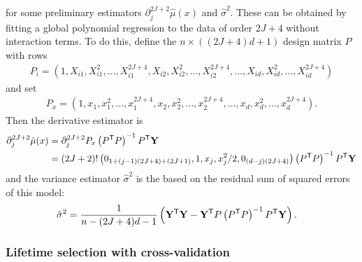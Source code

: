 %
for some preliminary estimators
$\partial^{2 J + 2}_j \hat\mu(x)$ and $\hat\sigma^2$.
These can be obtained by fitting a global polynomial regression
to the data of order $2 J + 4$ without interaction terms.
To do this, define the $n \times ((2 J + 4)d + 1)$ design matrix $P$ with rows
%
\begin{align*}
  P_i = \left(
    1, X_{i1}, X_{i1}^2, \ldots, X_{i1}^{2 J + 4},
    X_{i2}, X_{i2}^2, \ldots, X_{i2}^{2 J + 4},
    \ldots,
    X_{id}, X_{id}^2, \ldots, X_{id}^{2 J + 4}
  \right)
\end{align*}
%
and set
%
\begin{align*}
  P_x = \left(
    1, x_{1}, x_{1}^2, \ldots, x_{1}^{2 J + 4},
    x_{2}, x_{2}^2, \ldots, x_{2}^{2 J + 4},
    \ldots,
    x_{d}, x_{d}^2, \ldots, x_{d}^{2 J + 4}
  \right).
\end{align*}
%
Then the derivative estimator is
%
\begin{align*}
  \partial^{2 J + 2}_j \hat\mu(x)
  &=
  \partial^{2 J + 2}_j P_x
  \left( P^{\mathsf{T}} P \right)^{-1}
  P^{\mathsf{T}} \mathbf{Y} \\
  &=
  (2J + 2)!
  \left(
    0_{1 + (j-1)(2 J + 4) + (2J + 1)},
    1, x_j, x_j^2 / 2,
    0_{(d-j)(2 J + 4)}
  \right)
  \left( P^{\mathsf{T}} P \right)^{-1}
  P^{\mathsf{T}} \mathbf{Y}
\end{align*}
%
and the variance estimator $\hat\sigma^2$ is
the based on the residual sum of squared errors of this model:
%
\begin{align*}
  \hat\sigma^2
  &=
  \frac{1}{n - (2J + 4)d - 1}
  \left(
    \mathbf{Y}^{\mathsf{T}} \mathbf{Y}
    - \mathbf{Y}^{\mathsf{T}} P \left( P^{\mathsf{T}} P \right)^{-1} P^{\mathsf{T}} \mathbf{Y}
  \right).
\end{align*}

\subsubsection*{Lifetime selection with cross-validation}

